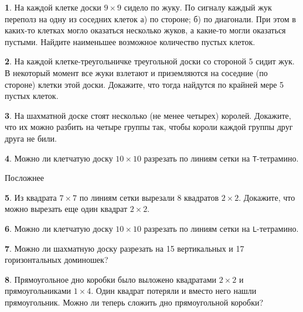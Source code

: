 \documentclass[b5paper,usehyperref, twoside]{article}
\theoremstyle{definition}
\theoremstyle{definition}
\newtheorem{Task}{}
\begin{document}
\begin{Task}
	На каждой клетке доски $9 \times 9$ сидело по жуку. По сигналу каждый жук переполз на одну из соседних клеток а) по стороне; б) по диагонали. При этом в каких-то клетках могло оказаться несколько жуков, а какие-то могли оказаться пустыми. Найдите наименьшее возможное количество пустых клеток.
\end{Task}

\begin{Task}
	На каждой клетке-треугольничке треугольной доски со стороной 5 сидит жук. В некоторый момент все жуки взлетают и приземляются на соседние (по стороне) клетки этой доски. Докажите, что тогда найдутся по крайней мере 5 пустых клеток.
\end{Task}


\begin{Task}
	На шахматной доске стоят несколько (не менее четырех) королей. Докажите, что их можно разбить на четыре группы так, чтобы короли каждой группы друг друга не били.
\end{Task}

\begin{Task}
	Можно ли клетчатую доску $10 \times 10$ разрезать по линиям сетки на \texttt{T}-тетрамино.
\end{Task}

\centerline{\LARGE Посложнее}

\begin{Task}
	Из квадрата $7\times 7$ по линиям сетки вырезали 8 квадратов $2 \times 2$. Докажите, что можно вырезать еще один квадрат $2 \times 2$.
\end{Task}

\begin{Task}
	Можно ли клетчатую доску $10 \times 10$ разрезать по линиям сетки на \texttt{L}-тетрамино.
\end{Task}

%


\begin{Task}
	Можно ли шахматную доску разрезать на 15 вертикальных и 17 горизонтальных доминошек?
\end{Task}

\begin{Task}
	Прямоугольное дно коробки было выложено квадратами $2 \times 2$ и прямоугольниками $1 \times 4$. Один квадрат потеряли и вместо него нашли прямоугольник. Можно ли теперь сложить дно прямоугольной коробки?
\end{Task}
	
\end{document}
